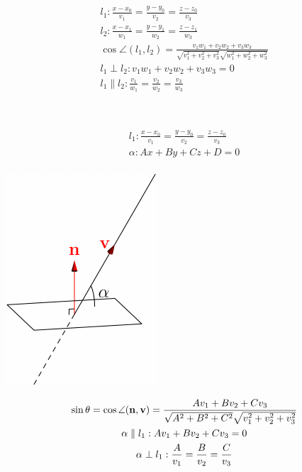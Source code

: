 \documentclass[main]{subfiles}
\begin{document}
\begin{definition}
    \begin{gather*}
        l_1: \frac{x-x_0}{v_1} = \frac{y-y_0}{v_2} = \frac{z-z_0}{v_3}\\
        l_2: \frac{x-x_1}{w_1} = \frac{y-y_1}{w_2} = \frac{z-z_1}{w_3}\\
        \cos\angle(l_1, l_2) = \frac{v_1 w_1 + v_2 w_2 + v_3 w_3}
        {\sqrt{v_1^2+v_2^2+v_3^2} \sqrt{w_1^2+w_2^2+w_3^2}}\\
        l_1 \perp l_2: v_1 w_1 + v_2 w_2 + v_3 w_3  = 0\\
        l_1 \parallel l_2: \frac{v_1}{w_1} = \frac{v_2}{w_2} = \frac{v_3}{w_3}
    \end{gather*}
\end{definition}

\begin{definition}\ \\
    \noindent\begin{minipage}{0.45\textwidth}
        \begin{gather*}
            l_1: \frac{x-x_0}{v_1} = \frac{y-y_0}{v_2} = \frac{z-z_0}{v_3}\\
            \alpha: Ax+By+Cz+D=0\\
        \end{gather*}
    \end{minipage}
    \begin{minipage}{0.45\textwidth}
        \begin{center}
            \includegraphics{figures/angle_between_line_and_plane.pdf}
        \end{center}
    \end{minipage}
    \begin{gather*}
        \sin\theta = \cos \angle (\vn, \vv) = \frac{Av_1 + Bv_2 + Cv_3}
        {\sqrt{A^2+B^2+C^2} \sqrt{v_1^2+v_2^2+v_3^2}}\\
        \alpha \parallel l_1: Av_1 + Bv_2 + Cv_3 = 0\\
        \alpha \perp l_1: \frac{A}{v_1} = \frac{B}{v_2} = \frac{C}{v_3}
    \end{gather*}
\end{definition}
\end{document}
